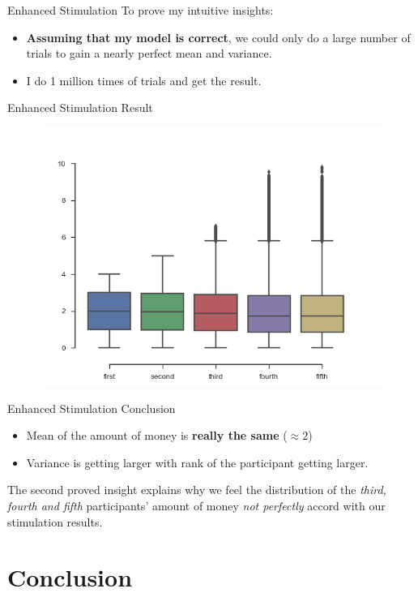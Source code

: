 \documentclass[12pt]{beamer}
\begin{document}
\begin{frame}{Enhanced Stimulation}
	To prove my intuitive insights:
	\begin{itemize}
		\item \textbf{Assuming that my model is correct}, we could only do a large number of trials to gain a nearly perfect mean and variance.
		\item I do 1 million times of trials and get the result.
	\end{itemize}
\end{frame}


\begin{frame}{Enhanced Stimulation Result}
	\begin{figure}
		\centering
		\includegraphics[width=0.7\columnwidth,height=0.6\linewidth]{fig/Stimulation.png}
	\end{figure}
\end{frame}

\begin{frame}{Enhanced Stimulation Conclusion}
	\begin{itemize}
		\item Mean of the amount of money is \textbf{really the same} (\(\approx2\))
		\item Variance is getting larger with rank of the participant getting larger.
	\end{itemize}
	The second proved insight explains why we feel the distribution of the \emph{third, fourth and fifth} participants' amount of money \emph{not perfectly} accord with our stimulation results.
\end{frame}

\section{Conclusion}
\end{document}
